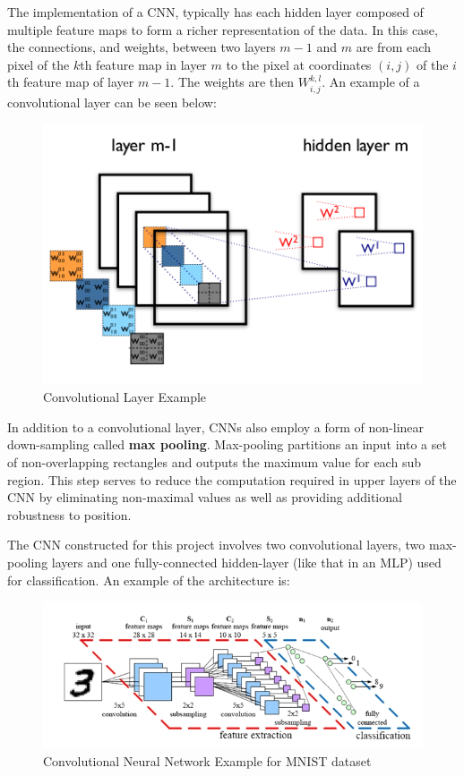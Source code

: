 \documentclass[12pt, titlepage]{article}
\begin{document}
  The implementation of a CNN, typically has each hidden layer composed of multiple feature maps to form a richer
  representation of the data. In this case, the connections, and weights, between two layers $m-1$ and $m$ are from each
  pixel of the $k$th feature map in layer $m$ to the pixel at coordinates $(i,j)$ of the $i$th feature map of layer $m-1$.
  The weights are then $W_{i,j}^{k,l}$. An example of a convolutional layer can be seen below: \\
  \FloatBarrier
  \begin{figure}[h]
    \caption{Convolutional Layer Example}
    \centering
    \includegraphics[scale=0.5]{images/conv_layer_cnn_example}
  \end{figure}
  \FloatBarrier
  
  In addition to a convolutional layer, CNNs also employ a form of non-linear down-sampling called \textbf{max pooling}.
  Max-pooling partitions an input into a set of non-overlapping rectangles and outputs the maximum value for each sub region.
  This step serves to reduce the computation required in upper layers of the CNN by eliminating non-maximal values as well as
  providing additional robustness to position.
  
  The CNN constructed for this project involves two convolutional layers, two max-pooling layers and one fully-connected
  hidden-layer (like that in an MLP) used for classification. An example of the architecture is: \\
  \FloatBarrier
  \begin{figure}[h]
    \caption{Convolutional Neural Network Example for MNIST dataset}
    \centering
    \includegraphics[scale=0.65]{images/architecture_cnn_example}
  \end{figure}
  \FloatBarrier
  
\end{document}

